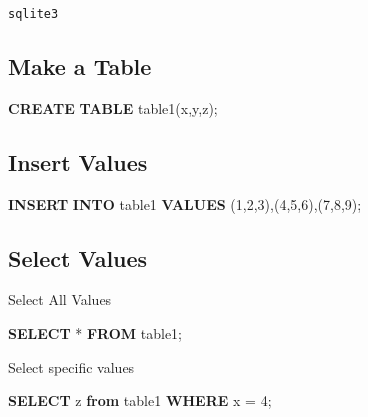 \documentclass[]{book}
\newenvironment{Shaded}{\begin{snugshade}}{\end{snugshade}}
\newcommand{\KeywordTok}[1]{\textcolor[rgb]{0.13,0.29,0.53}{\textbf{#1}}}
\newcommand{\DecValTok}[1]{\textcolor[rgb]{0.00,0.00,0.81}{#1}}
\newcommand{\NormalTok}[1]{#1}
\theoremstyle{definition}
\theoremstyle{definition}
\theoremstyle{definition}
\theoremstyle{remark}
\begin{document}
\texttt{sqlite3}

\subsection{Make a Table}\label{make-a-table}

\begin{Shaded}
\begin{Highlighting}[]
\KeywordTok{CREATE} \KeywordTok{TABLE}\NormalTok{ table1(x,y,z);}
\end{Highlighting}
\end{Shaded}

\subsection{Insert Values}\label{insert-values}

\begin{Shaded}
\begin{Highlighting}[]
\KeywordTok{INSERT} \KeywordTok{INTO}\NormalTok{ table1 }\KeywordTok{VALUES}\NormalTok{ (}\DecValTok{1}\NormalTok{,}\DecValTok{2}\NormalTok{,}\DecValTok{3}\NormalTok{),(}\DecValTok{4}\NormalTok{,}\DecValTok{5}\NormalTok{,}\DecValTok{6}\NormalTok{),(}\DecValTok{7}\NormalTok{,}\DecValTok{8}\NormalTok{,}\DecValTok{9}\NormalTok{);}
\end{Highlighting}
\end{Shaded}

\subsection{Select Values}\label{select-values}

Select All Values

\begin{Shaded}
\begin{Highlighting}[]
\KeywordTok{SELECT}\NormalTok{ * }\KeywordTok{FROM}\NormalTok{ table1;}
\end{Highlighting}
\end{Shaded}

Select specific values

\begin{Shaded}
\begin{Highlighting}[]
\KeywordTok{SELECT}\NormalTok{ z }\KeywordTok{from}\NormalTok{ table1 }\KeywordTok{WHERE}\NormalTok{ x = }\DecValTok{4}\NormalTok{;}
\end{Highlighting}
\end{Shaded}
\end{document}
